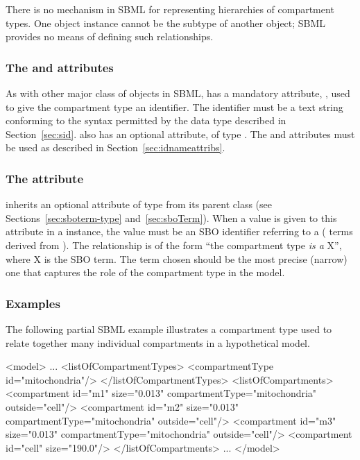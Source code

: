 There is no mechanism in SBML for representing hierarchies of
compartment types.  One \CompartmentType object instance cannot be the
subtype of another \CompartmentType object; SBML provides no
means of defining such relationships.


\subsubsection{The  and  attributes}

As with other major class of objects in SBML, \CompartmentType has a
mandatory attribute, , used to give the compartment type an
identifier.  The identifier must be a text string conforming to
the syntax permitted by the  data type described in
Section~\ref{sec:sid}.  \CompartmentType also has an optional
 attribute, of type .  The 
and  attributes must be used as described in
Section~\ref{sec:idnameattribs}.


\subsubsection{The  attribute}
\label{sec:compartmenttype-sboterm}

\CompartmentType inherits an optional 
attribute of type  from its parent
class \SBase (see Sections~\ref{sec:sboterm-type}
and~\ref{sec:sboTerm}).  When a value is given to this
attribute in a \CompartmentType instance, the value must
be an SBO identifier referring to a  (\ie
terms derived from \sbomaterialentity).  The relationship is
of the form ``the compartment type \emph{is a} X'', where X is the
SBO term.  The term chosen should be the most precise (narrow) one
that captures the role of the compartment type in the model.


\subsubsection{Examples}

The following partial SBML example illustrates a compartment type
used to relate together many individual compartments in a
hypothetical model.

\begin{example}
<model>
    ...
    <listOfCompartmentTypes>
        <compartmentType id="mitochondria"/>
    </listOfCompartmentTypes>
    <listOfCompartments>
        <compartment id="m1" size="0.013" compartmentType="mitochondria" outside="cell"/>
        <compartment id="m2" size="0.013" compartmentType="mitochondria" outside="cell"/>
        <compartment id="m3" size="0.013" compartmentType="mitochondria" outside="cell"/>
        <compartment id="cell" size="190.0"/>
    </listOfCompartments>
    ...
</model>

\end{example}



